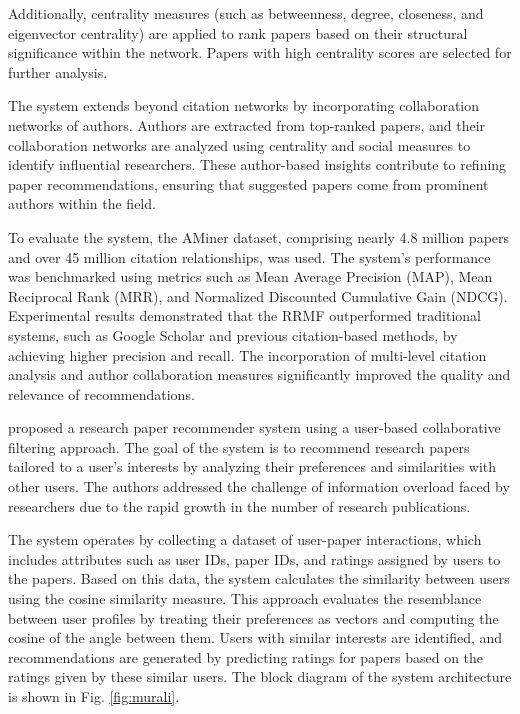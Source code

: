 Additionally, centrality measures (such as betweenness, degree, closeness, and eigenvector centrality) are applied to rank papers based on their structural significance within the network.
Papers with high centrality scores are selected for further analysis.

The system extends beyond citation networks by incorporating collaboration networks of authors.
Authors are extracted from top-ranked papers, and their collaboration networks are analyzed using centrality and social measures to identify influential researchers.
These author-based insights contribute to refining paper recommendations, ensuring that suggested papers come from prominent authors within the field.

To evaluate the system, the AMiner dataset, comprising nearly 4.8 million papers and over 45 million citation relationships, was used.
The system's performance was benchmarked using metrics such as Mean Average Precision (MAP), Mean Reciprocal Rank (MRR), and Normalized Discounted Cumulative Gain (NDCG).
Experimental results demonstrated that the RRMF outperformed traditional systems, such as Google Scholar and previous citation-based methods, by achieving higher precision and recall.
The incorporation of multi-level citation analysis and author collaboration measures significantly improved the quality and relevance of recommendations.

\cite{Murali2019} proposed a research paper recommender system using a user-based collaborative filtering approach.
The goal of the system is to recommend research papers tailored to a user's interests by analyzing their preferences and similarities with other users.
The authors addressed the challenge of information overload faced by researchers due to the rapid growth in the number of research publications.

The system operates by collecting a dataset of user-paper interactions, which includes attributes such as user IDs, paper IDs, and ratings assigned by users to the papers. Based on this data, the system calculates the similarity between users using the cosine similarity measure. This approach evaluates the resemblance between user profiles by treating their preferences as vectors and computing the cosine of the angle between them.
Users with similar interests are identified, and recommendations are generated by predicting ratings for papers based on the ratings given by these similar users.
The block diagram of the system architecture is shown in Fig. \ref{fig:murali}.

